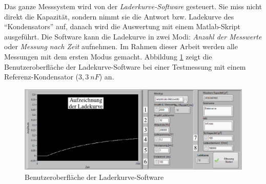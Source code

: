 Das ganze Messsystem wird von der \textit{Laderkurve-Software} gesteuert.
Sie miss nicht direkt die Kapazität, sondern nimmt sie die Antwort bzw. Ladekurve des ``Kondensators'' auf, danach wird die Auswertung mit einem Matlab-Skript ausgeführt.
Die Software kann die Ladekurve in zwei Modi: \emph{Anzahl der Messwerte} oder \emph{Messung nach Zeit} aufnehmen.
Im Rahmen dieser Arbeit werden alle Messungen mit dem ersten Modus gemacht.
Abbildung \ref{fig:gui_der_laderkurve_software} zeigt die Benutzeroberfläche der Ladekurve-Software bei einer Testmessung mit einem Referenz-Kondensator ($3,3 \ nF$) an.
\begin{figure}[htb]
    \centering
    \includegraphics[]{./images/ladekurven_gui.pdf}
    \caption{Benutzeroberfläche der Laderkurve-Software}
    \label{fig:gui_der_laderkurve_software}
\end{figure}

